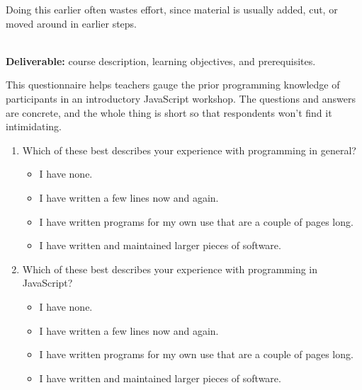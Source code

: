 Doing this earlier often wastes effort,
since material is usually added, cut, or moved around in earlier steps.

~\\
\noindent
\textbf{Deliverable:}
course description,
learning objectives,
and prerequisites.


This questionnaire helps teachers gauge the prior programming knowledge
of participants in an introductory JavaScript workshop.
The questions and answers are concrete,
and the whole thing is short so that respondents won't find it intimidating.

\begin{enumerate}

\item
  Which of these best describes
  your experience with programming in general?

  \begin{itemize}
    
  \item
    I have none.
    
  \item
    I have written a few lines now and again.
    
  \item
    I have written programs for my own use that are a couple of
    pages long.
    
  \item
    I have written and maintained larger pieces of software.\\
    
  \end{itemize}

\item
  Which of these best describes
  your experience with programming in JavaScript?

  \begin{itemize}
    
  \item
    I have none.
    
  \item
    I have written a few lines now and again.
    
  \item
    I have written programs for my own use that are a couple of
    pages long.
    
  \item
    I have written and maintained larger pieces of software.\\
    

\end{itemize}
\end{enumerate}
